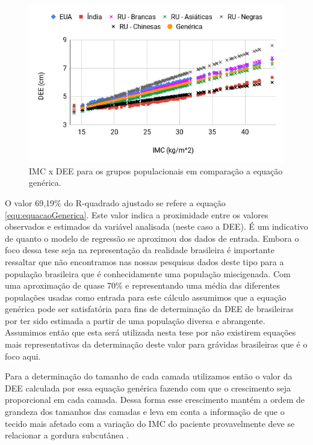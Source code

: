 \begin{figure}[ht!]
    \centering
    \includegraphics[width=0.9\linewidth]{capitulos/figuras/IMC versus DEE grupos populacionais e Equacao Generica.png} 
    \caption{\acrshort{IMC} x \acrshort{DEE} para os grupos populacionais em comparação a equação genérica.}
    \label{fig:imcDEEPopulacoesComparativoEquacaoGenerica}
\end{figure}

O valor 69,19\% do R-quadrado ajustado se refere a equação \ref{equ:equacaoGenerica}. Este valor indica a proximidade entre os valores observados e estimados da variável analisada (neste caso a \acrshort{DEE}). É um indicativo de quanto o modelo de regressão se aproximou dos dados de entrada. Embora o foco dessa tese seja na representação da realidade brasileira é importante ressaltar que não encontramos nas nossas pesquisas dados deste tipo para a população brasileira que é conhecidamente uma população miscigenada.  Com uma aproximação de quase 70\% e representando uma média das diferentes populações usadas como entrada para este cálculo assumimos que a equação genérica pode ser satisfatória para fins de determinação da \acrshort{DEE} de brasileiras por ter sido estimada a partir de uma população diversa e abrangente. Assumimos então que esta será utilizada nesta tese por não existirem equações mais representativas da determinação deste valor para grávidas brasileiras que é o foco aqui.

Para a determinação do tamanho de cada camada utilizamos então o valor da \acrshort{DEE} calculada por essa equação genérica fazendo com que o crescimento seja proporcional em cada camada. Dessa forma esse crescimento mantém a ordem de grandeza dos tamanhos das camadas e leva em conta a informação de que o tecido mais afetado com a variação do \acrshort{IMC} do paciente provavelmente deve se relacionar a gordura subcutânea \cite{Palmer1983}.

